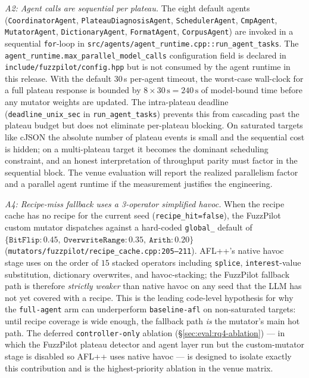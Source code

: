\documentclass[11pt]{article}
\begin{document}
\emph{A2: Agent calls are sequential per plateau.}
The eight default agents
(\texttt{CoordinatorAgent}, \texttt{PlateauDiagnosisAgent},
\texttt{SchedulerAgent}, \texttt{CmpAgent}, \texttt{MutatorAgent},
\texttt{DictionaryAgent}, \texttt{FormatAgent}, \texttt{CorpusAgent})
are invoked in a sequential \texttt{for}-loop in
\texttt{src/agents/agent\_runtime.cpp::run\_agent\_tasks}. The
\texttt{agent\_runtime.max\_parallel\_model\_calls} configuration
field is declared in \texttt{include/fuzzpilot/config.hpp} but is
not consumed by the agent runtime in this release. With the default
$30$\,s per-agent timeout, the worst-case wall-clock for a full
plateau response is bounded by
$8 \times 30\,\text{s} = 240\,\text{s}$ of model-bound time before
any mutator weights are updated. The intra-plateau deadline
(\texttt{deadline\_unix\_sec} in
\texttt{run\_agent\_tasks}) prevents this from cascading past the
plateau budget but does not eliminate per-plateau blocking. On
saturated targets like cJSON the absolute number of plateau events
is small and the sequential cost is hidden; on a multi-plateau
target it becomes the dominant scheduling constraint, and an
honest interpretation of throughput parity must factor in the
sequential block. The venue evaluation will report the realized
parallelism factor and a parallel agent runtime if the measurement
justifies the engineering.

\emph{A4: Recipe-miss fallback uses a 3-operator simplified havoc.}
When the recipe cache has no recipe for the current seed
(\texttt{recipe\_hit=false}), the FuzzPilot custom mutator
dispatches against a hard-coded \texttt{global\_} default of
$\{\texttt{BitFlip}{:}0.45,\ \texttt{OverwriteRange}{:}0.35,\
\texttt{Arith}{:}0.20\}$
(\texttt{mutators/fuzzpilot/recipe\_cache.cpp:205--211}).
AFL++'s native havoc stage uses on the order of $15$ stacked
operators including \texttt{splice}, \texttt{interest}-value
substitution, dictionary overwrites, and havoc-stacking; the
FuzzPilot fallback path is therefore \emph{strictly weaker} than
native havoc on any seed that the LLM has not yet covered with a
recipe. This is the leading code-level hypothesis for why the
\texttt{full-agent} arm can underperform \texttt{baseline-afl} on
non-saturated targets: until recipe coverage is wide enough, the
fallback path \emph{is} the mutator's main hot path. The deferred
\texttt{controller-only} ablation
(\S\ref{sec:eval:rq4-ablation}) --- in which the FuzzPilot plateau
detector and agent layer run but the custom-mutator stage is
disabled so AFL++ uses native havoc --- is designed to isolate
exactly this contribution and is the highest-priority ablation in
the venue matrix.
\end{document}
